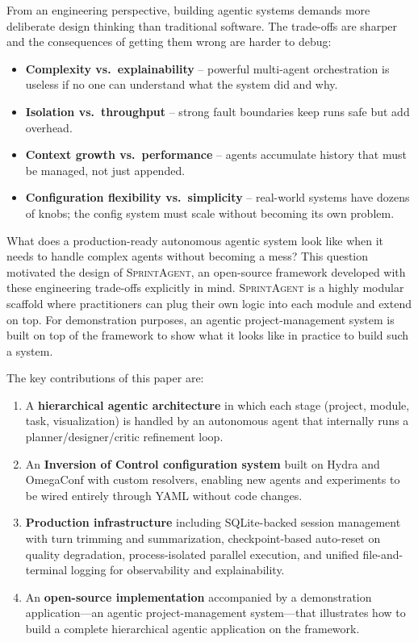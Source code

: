 \documentclass[11pt, a4paper]{article}
\newcommand{\sprintagent}{\textsc{SprintAgent}}
\newcommand{\ioc}{Inversion of Control}
\begin{document}
From an engineering perspective, building agentic systems demands more
deliberate design thinking than traditional software.  The trade-offs
are sharper and the consequences of getting them wrong are harder to
debug:
\begin{itemize}[leftmargin=*]
  \item \textbf{Complexity vs.\ explainability} -- powerful multi-agent
    orchestration is useless if no one can understand what the system
    did and why.
  \item \textbf{Isolation vs.\ throughput} -- strong fault boundaries
    keep runs safe but add overhead.
  \item \textbf{Context growth vs.\ performance} -- agents accumulate
    history that must be managed, not just appended.
  \item \textbf{Configuration flexibility vs.\ simplicity} -- real-world
    systems have dozens of knobs; the config system must scale without
    becoming its own problem.
\end{itemize}

What does a production-ready autonomous agentic system look like when it
needs to handle complex agents without becoming a mess?  This question
motivated the design of \sprintagent{}, an open-source framework
developed with these engineering trade-offs explicitly in mind.
\sprintagent{} is a highly modular scaffold where practitioners can plug
their own logic into each module and extend on top.  For demonstration
purposes, an agentic project-management system is built on top of the
framework to show what it looks like in practice to build such a system.

The key contributions of this paper are:
\begin{enumerate}[leftmargin=*]
  \item A \textbf{hierarchical agentic architecture} in which each stage
    (project, module, task, visualization) is handled by an autonomous
    agent that internally runs a planner/designer/critic refinement loop.
  \item An \textbf{\ioc{} configuration system} built on Hydra and
    OmegaConf with custom resolvers, enabling new agents and experiments
    to be wired entirely through YAML without code changes.
  \item \textbf{Production infrastructure} including SQLite-backed
    session management with turn trimming and summarization, checkpoint-based
    auto-reset on quality degradation, process-isolated parallel
    execution, and unified file-and-terminal logging for observability
    and explainability.
  \item An \textbf{open-source implementation} accompanied by a
    demonstration application---an agentic project-management
    system---that illustrates how to build a complete hierarchical
    agentic application on the framework.
\end{enumerate}
\end{document}
